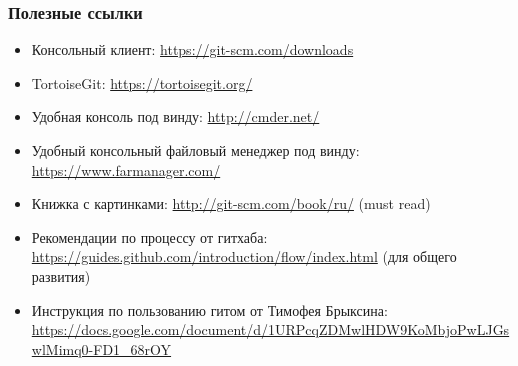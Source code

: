 \documentclass[xetex,mathserif,serif]{beamer}
\begin{document}
	\begin{frame}
		\frametitle{Полезные ссылки}
		\begin{itemize}
			\item Консольный клиент: \url{https://git-scm.com/downloads}
			\item TortoiseGit: \url{https://tortoisegit.org/}
			\item Удобная консоль под винду: \url{http://cmder.net/}
			\item Удобный консольный файловый менеджер под винду: \url{https://www.farmanager.com/}
			\item Книжка с картинками: \url{http://git-scm.com/book/ru/} (must read)
			\item Рекомендации по процессу от гитхаба: \url{https://guides.github.com/introduction/flow/index.html} (для общего развития)
			\item Инструкция по пользованию гитом от Тимофея Брыксина: \url{https://docs.google.com/document/d/1URPcqZDMwlHDW9KoMbjoPwLJGswlMimq0-FD1_68rOY}
		\end{itemize}
	\end{frame}
\end{document}

